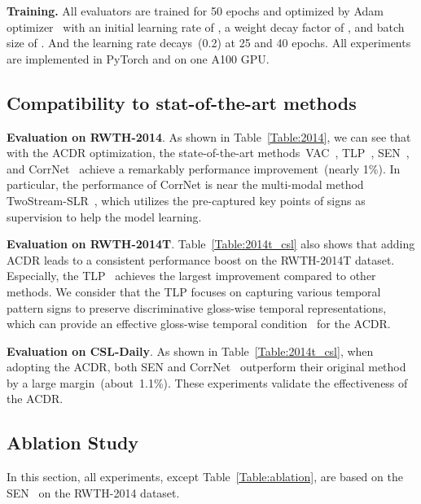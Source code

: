 \documentclass[sigconf]{acmart}
\begin{document}
\noindent \textbf{Training.}
All evaluators are trained for 50 epochs and optimized by Adam optimizer~\cite{kingma2014adam} with an initial learning rate of , a weight decay factor of , and batch size of .
And the learning rate decays~(0.2) at 25 and 40 epochs.
All experiments are implemented in PyTorch and on one A100 GPU.

\subsection{Compatibility to stat-of-the-art methods}
\label{sec:sota}

\noindent \textbf{Evaluation on RWTH-2014}.
As shown in Table~\ref{Table:2014}, we can see that with the ACDR optimization, the state-of-the-art methods~VAC~\cite{min2021visual},
TLP~\cite{hu2022temporal}, SEN~\cite{Hu2022SelfEmphasizingNF}, and CorrNet~\cite{hu2023continuous} achieve a remarkably performance improvement~(nearly 1\%). 
In particular, the performance of CorrNet is near the multi-modal method TwoStream-SLR~\cite{chen2022two}, which utilizes the pre-captured key points of signs as supervision to help the model learning.

\noindent \textbf{Evaluation on RWTH-2014T}.
Table~\ref{Table:2014t_csl} also shows that adding ACDR leads to a consistent performance boost on the RWTH-2014T dataset. 
Especially, the TLP~\cite{hu2022temporal} achieves the largest improvement compared to other methods.
We consider that the TLP focuses on capturing various temporal pattern signs to preserve discriminative gloss-wise temporal representations, which can provide an effective  gloss-wise temporal condition~ for the ACDR.

\noindent \textbf{Evaluation on CSL-Daily}.
As shown in Table~\ref{Table:2014t_csl}, when adopting the ACDR, both SEN\cite{Hu2022SelfEmphasizingNF} and CorrNet~\cite{hu2023continuous} outperform their original method by a large margin~(about~1.1\%).
These experiments validate the effectiveness of the ACDR.

\subsection{Ablation Study}
\label{sec:ablation}
In this section, all experiments, except Table~\ref{Table:ablation}, are based on the SEN~\cite{Hu2022SelfEmphasizingNF} on the RWTH-2014 dataset.
\end{document}

